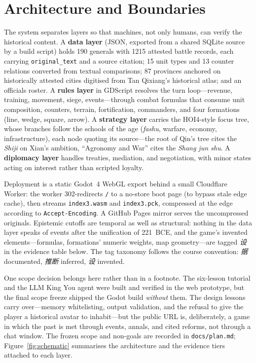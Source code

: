 \documentclass[12pt,a4paper]{article}
\begin{document}
\section{Architecture and Boundaries}

The system separates layers so that machines, not only humans, can verify the
historical content. A \textbf{data layer} (JSON, exported from a shared
SQLite source by a build script) holds 190 generals with 1215 attested battle
records, each carrying \texttt{original\_text} and a source citation; 15 unit
types and 13 counter relations converted from textual comparisons; 87
provinces anchored on historically attested cities digitised from Tan
Qixiang's historical atlas;\autocite{tan1982atlas} and an officials roster. A
\textbf{rules layer} in GDScript resolves the turn loop---revenue, training,
movement, siege, events---through combat formulas that consume unit
composition, counters, terrain, fortification, commanders, and four
formations (line, wedge, square, arrow). A \textbf{strategy layer} carries
the HOI4-style focus tree, whose branches follow the schools of the age
(\emph{fashu}, warfare, economy, infrastructure), each node quoting its
source---the root of Qin's tree cites the \emph{Shiji} on Xian's ambition,
``Agronomy and War'' cites the \emph{Shang jun shu}. A \textbf{diplomacy
layer} handles treaties, mediation, and negotiation, with minor states acting
on interest rather than scripted loyalty.

Deployment is a static Godot~4 WebGL export behind a small Cloudflare Worker:
the worker 302-redirects \texttt{/} to a no-store boot page (to bypass stale
edge cache), then streams \texttt{index3.wasm} and \texttt{index3.pck},
compressed at the edge according to \texttt{Accept-Encoding}. A GitHub Pages
mirror serves the uncompressed originals. Epistemic cutoffs are temporal as
well as structural: nothing in the data layer speaks of events after the
unification of 221~BCE, and the game's invented elements---formulas,
formations' numeric weights, map geometry---are tagged \emph{设} in the
evidence table below. The tag taxonomy follows the course convention:
\emph{据} documented, \emph{推断} inferred, \emph{设} invented.

One scope decision belongs here rather than in a footnote. The six-lesson
tutorial and the LLM King You agent were built and verified in the web
prototype, but the final scope freeze shipped the Godot build \emph{without}
them. The design lessons carry over---memory whitelisting, output validation,
and the refusal to give the player a historical avatar to inhabit---but the
public URL is, deliberately, a game in which the past is met through events,
annals, and cited reforms, not through a chat window. The frozen scope and
non-goals are recorded in \texttt{docs/plan.md}; Figure~\ref{fig:schematic}
summarises the architecture and the evidence tiers attached to each layer.
\end{document}
